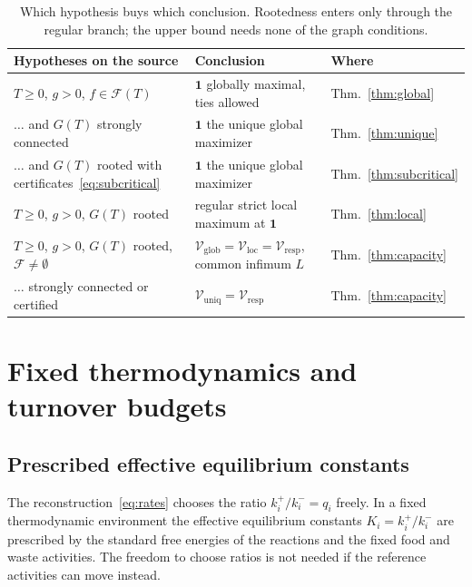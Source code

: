 \documentclass[11pt,a4paper]{article}
\theoremstyle{plain}
\theoremstyle{definition}
\theoremstyle{remark}
\numberwithin{equation}{section}
\newcommand{\one}{\mathbf{1}}
\newcommand{\cone}{\mathcal{F}}
\newcommand{\Vresp}{\mathcal{V}_{\mathrm{resp}}}
\newcommand{\Vloc}{\mathcal{V}_{\mathrm{loc}}}
\newcommand{\Vglob}{\mathcal{V}_{\mathrm{glob}}}
\newcommand{\Vuniq}{\mathcal{V}_{\mathrm{uniq}}}
\begin{document}
\begin{table}[t]
\centering\small
\begin{tabular}{@{}lll@{}}
\toprule
Hypotheses on the source & Conclusion & Where \\
\midrule
$T\ge0$, $g>0$, $f\in\cone(T)$ & $\one$ globally maximal, ties allowed & Thm.~\ref{thm:global} \\
$\ldots$ and $G(T)$ strongly connected & $\one$ the unique global maximizer & Thm.~\ref{thm:unique} \\
$\ldots$ and $G(T)$ rooted with certificates~\eqref{eq:subcritical} & $\one$ the unique global maximizer & Thm.~\ref{thm:subcritical} \\
$T\ge0$, $g>0$, $G(T)$ rooted & regular strict local maximum at $\one$ & Thm.~\ref{thm:local} \\
$T\ge0$, $g>0$, $G(T)$ rooted, $\cone\ne\emptyset$ & $\Vglob=\Vloc=\Vresp$, common infimum $L$ & Thm.~\ref{thm:capacity} \\
$\ldots$ strongly connected or certified & $\Vuniq=\Vresp$ & Thm.~\ref{thm:capacity} \\
\bottomrule
\end{tabular}
\caption{Which hypothesis buys which conclusion. Rootedness enters only through the regular branch; the upper bound needs none of the graph conditions.}
\label{tab:hyp}
\end{table}

\section{Fixed thermodynamics and turnover budgets}\label{sec:thermo}

\subsection{Prescribed effective equilibrium constants}
The reconstruction~\eqref{eq:rates} chooses the ratio $k^+_i/k^-_i=q_i$ freely. In a fixed thermodynamic environment the effective equilibrium constants $K_i=k^+_i/k^-_i$ are prescribed by the standard free energies of the reactions and the fixed food and waste activities. The freedom to choose ratios is not needed if the reference activities can move instead.
\end{document}

